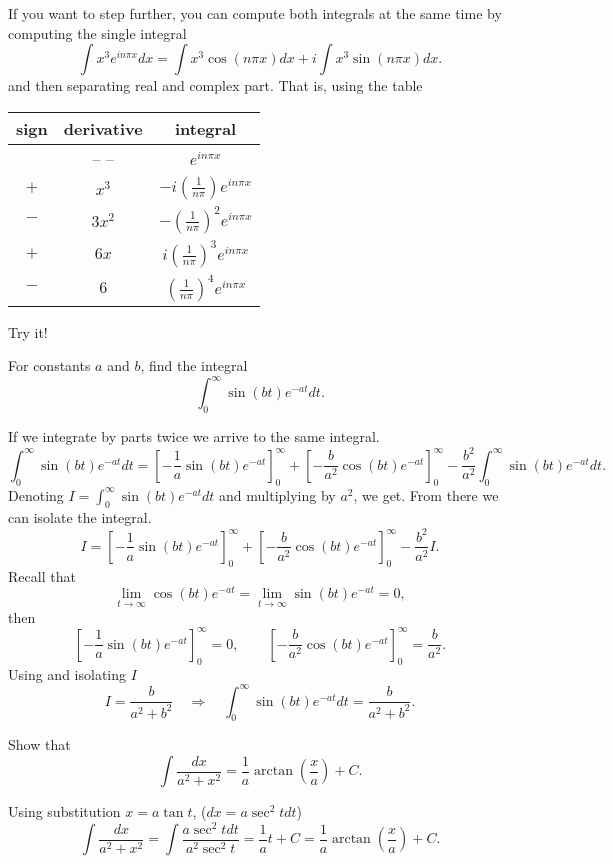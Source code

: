 \documentclass[11pt]{article}
\begin{document}
\begin{solution}
If you want to step further, you can compute both integrals at the same time by computing the single integral
\[ \int x^{3}e^{i n\pi x}dx = \int x^{3}\cos(n\pi x)dx + i \int x^{3}\sin(n\pi x)dx.\]
and then separating real and complex part. That is, using the table
\begin{center}
\begin{tabular}{c|c|c}
sign & derivative & integral \\
\hline
    &   -- --  & $ e^{i n\pi x}$ \\
$+$ & $x^{3}$  & $-i\left( \frac{1}{n \pi} \right) e^{i n\pi x}$ \\
$-$ & $3x^{2}$ & $- \left( \frac{1}{n \pi} \right)^{2} e^{i n\pi x}$ \\
$+$ & $6x$     & $ i\left( \frac{1}{n \pi} \right)^{3} e^{i n\pi x}$ \\
$-$ & $6$      & $  \left( \frac{1}{n \pi} \right)^{4} e^{i n\pi x}$
\end{tabular}
\end{center} 
Try it!
\end{solution}



\begin{problem}
For constants $a$ and $b$, find the integral
\[\int_{0}^{\infty} \sin(bt)e^{-at}dt.\]
\end{problem}
\begin{solution}
If we integrate by parts twice we arrive to the same integral.
\[\int_{0}^{\infty} \sin(bt)e^{-at}dt  = \left[ -\frac{1}{a}\sin (bt)e^{-at}\right]^{\infty}_{0} + \left[- \frac{b}{a^{2}}\cos (bt)e^{-at}\right]^{\infty}_{0} - \frac{b^{2}}{a^{2}}\int_{0}^{\infty}\sin(bt)e^{-at}dt.\]
Denoting $I=\int_{0}^{\infty} \sin(bt)e^{-at}dt$ and multiplying by $a^{2}$, we get. From there we can isolate the integral.
\[I = \left[ -\frac{1}{a}\sin (bt)e^{-at}\right]^{\infty}_{0} + \left[- \frac{b}{a^{2}}\cos (bt)e^{-at}\right]^{\infty}_{0} - \frac{b^{2}}{a^{2}}I.\]
Recall that
\[\lim_{t\rightarrow{\infty}}\cos(bt)e^{-at}=\lim_{t\rightarrow{\infty}}\sin(bt)e^{-at}=0,\]
then 
\[\left[ -\frac{1}{a}\sin (bt)e^{-at}\right]^{\infty}_{0} = 0 , \qquad \left[ -\frac{b}{a^{2}}\cos (bt)e^{-at}\right]^{\infty}_{0} = \frac{b}{a^{2}}.\]
Using and isolating $I$
\[I= \frac{b}{a^{2}+b^{2}} \quad \Rightarrow \quad  \boxed{\int_{0}^{\infty} \sin(bt)e^{-at}dt= \frac{b}{a^{2}+b^{2}}}.\]
\end{solution}



\begin{problem}
Show that
\[\int \frac{dx}{a^{2}+x^{2}}=\frac{1}{a}\arctan \left( \frac{x}{a} \right)+C.\]
\end{problem}
\begin{solution}
Using substitution $x = a \tan t$, ($dx = a \sec^{2}tdt$)
\[\int \frac{dx}{a^{2}+x^{2}} = \int \frac{a\sec^{2} t dt}{a^{2}\sec^{2}t} = \frac{1}{a}t + C = \boxed{\frac{1}{a}\arctan\left( \frac{x}{a} \right) + C}.\]
\end{solution}
\end{document}
